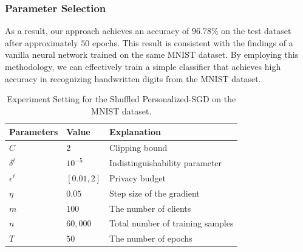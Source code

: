\documentclass[letterpaper]{article} %
\begin{document}
\subsubsection*{Parameter Selection}
As a result, our approach achieves an accuracy of $96.78 \%$ on the test dataset after approximately $50$ epochs. This result is consistent with the findings of a vanilla neural network \cite{lecun1998gradient} trained on the same MNIST dataset.
By employing this methodology, we can effectively train a simple classifier that achieves high accuracy in recognizing handwritten digits from the MNIST dataset.

\begin{table}[htbp]
\setlength{\tabcolsep}{3pt} %
  \centering
  \caption{Experiment Setting for the Shuffled Personalized-SGD on the MNIST dataset.}
    \begin{tabular}{lll}
    \toprule
    \textbf{Parameters} & \multicolumn{1}{l}{\textbf{Value}} & \textbf{Explanation} \\
    \midrule
    $C$     & $2$    & Clipping bound \\
    $\delta^{\ell}$ & \multicolumn{1}{l}{$10^{-5}$} & Indistinguishability parameter \\
    $\epsilon^{\ell}$ & \multicolumn{1}{l}{$[0.01,2]$} & Privacy budget \\
    $\eta$ & $0.05$   & Step size of the gradient \\
    $m$     & $100$    & The number of clients \\
    $n$    & $60,000$ & Total number of training samples \\
    $T$    & $50$     & The number of epochs \\
    \bottomrule
    \end{tabular}%
  \label{tab:Experimentsetup}%
\end{table}%
\end{document}
